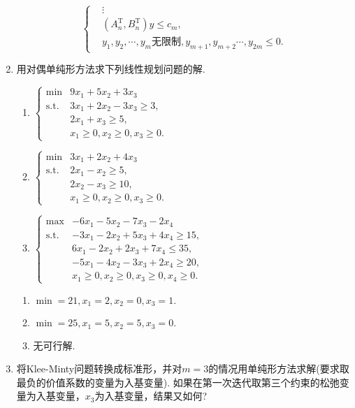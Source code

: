 \begin{enumerate}
\[\begin{cases}
        & \vdots\\
        & (A_n^{\mathrm{T}},B_n^{\mathrm{T}})y \leqslant c_m,\\
        & y_1,y_2,\cdots,y_m \text{无限制}, y_{m+1},y_{m+2}\cdots,y_{2m} \leqslant 0.
    \end{cases}\]
    \item 用对偶单纯形方法求下列线性规划问题的解.
    \begin{enumerate}[label=(\arabic*)]
        \item $\begin{cases}
            \min & 9x_1+5x_2+3x_3\\
            \text{s.t.} & 3x_1+2x_2-3x_3 \geqslant 3,\\
            & 2x_1+x_3 \geqslant 5,\\
            & x_1 \geqslant 0, x_2 \geqslant 0, x_3 \geqslant 0.
        \end{cases}$
        \item $\begin{cases}
            \min & 3x_1+2x_2+4x_3\\
            \text{s.t.} & 2x_1-x_2 \geqslant 5,\\
            & 2x_2-x_3 \geqslant 10,\\
            & x_1 \geqslant 0, x_2 \geqslant 0, x_3 \geqslant 0.
        \end{cases}$
        \item $\begin{cases}
            \max & -6x_1-5x_2-7x_3-2x_4\\
            \text{s.t.} & -3x_1-2x_2+5x_3+4x_4 \geqslant 15,\\
            & 6x_1-2x_2+2x_3+7x_4 \leqslant 35,\\
            & -5x_1-4x_2-3x_3+2x_4 \geqslant 20,\\
            & x_1 \geqslant 0, x_2 \geqslant 0, x_3 \geqslant 0, x_4 \geqslant 0.
        \end{cases}$
    \end{enumerate}
    \sol
    \begin{enumerate}[label=(\arabic*)]
        \item $\displaystyle\min=21,x_1=2,x_2=0,x_3=1.$
        \item $\displaystyle\min=25,x_1=5,x_2=5,x_3=0.$
        \item 无可行解.
    \end{enumerate}
    \item 将Klee-Minty问题转换成标准形，并对$m = 3$的情况用单纯形方法求解(要求取最负的价值系数的变量为入基变量). 如果在第一次迭代取第三个约束的松弛变量为入基变量，$x_3$为入基变量，结果又如何?\\

\end{enumerate}
